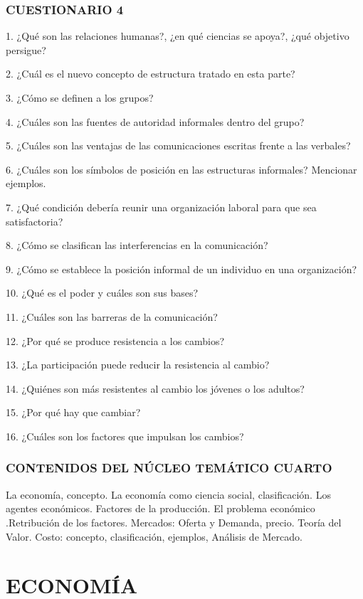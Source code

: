 \subsubsection*{CUESTIONARIO 4}
1. ¿Qué son las relaciones humanas?, ¿en qué ciencias se apoya?, ¿qué objetivo persigue?

2. ¿Cuál es el nuevo concepto de estructura tratado en esta parte?

3. ¿Cómo se definen a los grupos?

4. ¿Cuáles son las fuentes de autoridad informales dentro del grupo?

5. ¿Cuáles son las ventajas de las comunicaciones escritas frente a las verbales?

6. ¿Cuáles son los símbolos de posición en las estructuras informales? Mencionar ejemplos.

7. ¿Qué condición debería reunir una organización laboral para que sea satisfactoria?

8. ¿Cómo se clasifican las interferencias en la comunicación?

9. ¿Cómo se establece la posición informal de un individuo en una organización?

10. ¿Qué es el poder y cuáles son sus bases?

11. ¿Cuáles son las barreras de la comunicación?

12. ¿Por qué se produce resistencia a los cambios?

13. ¿La participación puede reducir la resistencia al cambio?

14. ¿Quiénes son más resistentes al cambio los jóvenes o los adultos?

15. ¿Por qué hay que cambiar?

16. ¿Cuáles son los factores que impulsan los cambios?



\subsubsection*{CONTENIDOS DEL NÚCLEO TEMÁTICO CUARTO}
La economía, concepto. La economía como ciencia social, clasificación. Los agentes económicos. Factores de la producción. El problema económico .Retribución de los factores. Mercados: Oferta y Demanda, precio. Teoría del Valor. Costo: concepto, clasificación, ejemplos, Análisis de Mercado.

\section*{ECONOMÍA}
